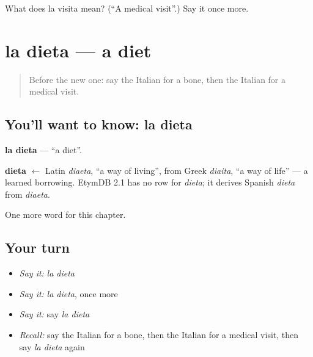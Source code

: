 \begin{tcolorbox}[breakable,colback=teal!4,colframe=teal!35!black,title={Before you move on}]
What does la visita mean? (\textquotedblleft{}A medical visit\textquotedblright{}.) Say it once more.
\end{tcolorbox}
\section[la dieta]{la dieta — a diet}

\label{lesson:IT-C152-dieta}



\begin{quote}
Before the new one: say the Italian for a bone, then the Italian for a medical visit.
\end{quote}

\subsection*{You'll want to know: la dieta}
\textbf{la dieta} — \textquotedblleft{}a diet\textquotedblright{}.

\begin{cousinweb}
\textbf{dieta} $\leftarrow$ Latin \emph{diaeta}, \textquotedblleft{}a way of living\textquotedblright{}, from Greek \emph{diaita}, \textquotedblleft{}a way of life\textquotedblright{} — a learned borrowing. EtymDB 2.1 has no row for \emph{dieta}; it derives Spanish \emph{dieta} from \emph{diaeta}.
\end{cousinweb}

\begin{grammarlens}[title={What you've built}]
One more word for this chapter.
\end{grammarlens}

\subsection*{Your turn}
\begin{itemize}
\raggedright
  \item \emph{Say it:} \emph{la dieta}
  \item \emph{Say it:} \emph{la dieta}, once more
  \item \emph{Say it:} say \emph{la dieta}
  \item \emph{Recall:} say the Italian for a bone, then the Italian for a medical visit, then say \emph{la dieta} again
\end{itemize}

